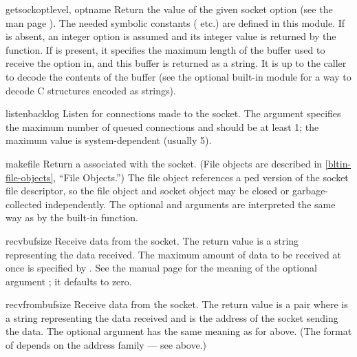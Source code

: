 \begin{methoddesc}[socket]{getsockopt}{level, optname}
Return the value of the given socket option (see the \UNIX{} man page
).  The needed symbolic constants
( etc.) are defined in this module.  If 
is absent, an integer option is assumed and its integer value
is returned by the function.  If  is present, it specifies
the maximum length of the buffer used to receive the option in, and
this buffer is returned as a string.  It is up to the caller to decode
the contents of the buffer (see the optional built-in module
 for a way to decode C structures encoded as strings).
\end{methoddesc}

\begin{methoddesc}[socket]{listen}{backlog}
Listen for connections made to the socket.  The  argument
specifies the maximum number of queued connections and should be at
least 1; the maximum value is system-dependent (usually 5).
\end{methoddesc}

\begin{methoddesc}[socket]{makefile}{}
Return a  associated with the socket.  (File objects
are described in \ref{bltin-file-objects}, ``File Objects.'')
The file object references a ped version of the
socket file descriptor, so the file object and socket object may be
closed or garbage-collected independently.
The optional 
and  arguments are interpreted the same way as by the
built-in  function.
\end{methoddesc}

\begin{methoddesc}[socket]{recv}{bufsize}
Receive data from the socket.  The return value is a string representing
the data received.  The maximum amount of data to be received
at once is specified by .  See the \UNIX{} manual page
 for the meaning of the optional argument
; it defaults to zero.
\end{methoddesc}

\begin{methoddesc}[socket]{recvfrom}{bufsize}
Receive data from the socket.  The return value is a pair
 where  is a string
representing the data received and  is the address of the
socket sending the data.  The optional  argument has the
same meaning as for  above.
(The format of  depends on the address family --- see above.)
\end{methoddesc}


